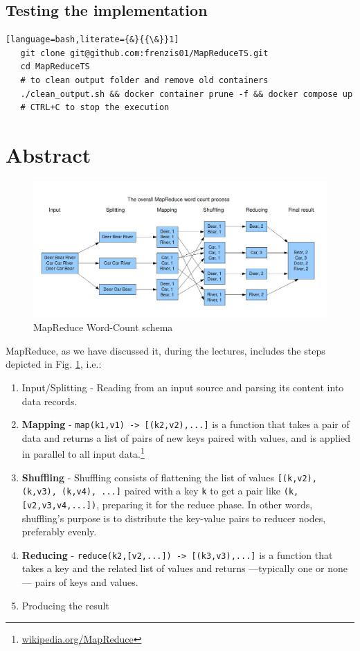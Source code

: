 \subsection*{Testing the implementation}
{\ns
\begin{lstlisting}[language=bash,literate={&}{{\&}}1]
   git clone git@github.com:frenzis01/MapReduceTS.git
   cd MapReduceTS
   # to clean output folder and remove old containers
   ./clean_output.sh && docker container prune -f && docker compose up
   # CTRL+C to stop the execution
\end{lstlisting}
}
\newpage

\section{Abstract}
\begin{figure}[htbp]
   \centering
   \includegraphics[width=\columnwidth]{images/mapreduce.png}
   \caption{MapReduce Word-Count schema}
   \label{fig:mapreduce}
\end{figure}

{MapReduce, as we have discussed it, during the lectures, includes the steps depicted in Fig. \ref{fig:mapreduce}, i.e.:\ns
\begin{enumerate} 
   \item Input/Splitting - Reading from an input source and parsing its content into data records.
   \item \textbf{Mapping} - \verb|map(k1,v1) -> [(k2,v2),...]| is a function that takes a pair of data and returns a list of pairs of new keys paired with values, and is applied in parallel to all input data.\footnote{\href{https://en.wikipedia.org/wiki/MapReduce}{wikipedia.org/MapReduce}}
   \item \textbf{Shuffling} - Shuffling consists of flattening the list of values \verb|[(k,v2), (k,v3), (k,v4), ...]| paired with a key \texttt{k} to get a pair like \verb|(k,[v2,v3,v4,...])|, preparing it for the reduce phase. In other words, shuffling's purpose is to distribute the key-value pairs to reducer nodes, preferably evenly. 
   \item \textbf{Reducing} - \verb|reduce(k2,[v2,...]) -> [(k3,v3),...]| is a function that takes a key and the related list of values and returns ---typically one or none--- pairs of keys and values. 
   \item Producing the result
\end{enumerate}}

